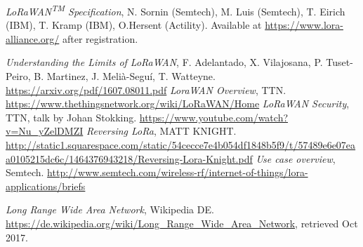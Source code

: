 \begin{thebibliography}{9}

    \textit{LoRaWAN\textsuperscript{TM} Specification}, N. Sornin (Semtech), M. Luis (Semtech), T. Eirich (IBM), T. Kramp (IBM), O.Hersent (Actility). Available at \url{https://www.lora-alliance.org/} after registration.

    \textit{Understanding the Limits of LoRaWAN}, F. Adelantado, X. Vilajosana, P. Tuset-Peiro, B. Martinez, J. Melià-Seguí, T. Watteyne. \url{https://arxiv.org/pdf/1607.08011.pdf}
    \textit{LoraWAN Overview}, TTN. \url{https://www.thethingsnetwork.org/wiki/LoRaWAN/Home}
    \textit{LoRaWAN Security}, TTN, talk by Johan Stokking. \url{https://www.youtube.com/watch?v=Nu_yZelDMZI}
    \textit{Reversing LoRa}, MATT KNIGHT. \url{http://static1.squarespace.com/static/54cecce7e4b054df1848b5f9/t/57489e6e07eaa0105215dc6c/1464376943218/Reversing-Lora-Knight.pdf}
    \textit{Use case overview}, Semtech. \url{http://www.semtech.com/wireless-rf/internet-of-things/lora-applications/briefs}


  \textit{Long Range Wide Area Network}, Wikipedia DE. \url{https://de.wikipedia.org/wiki/Long_Range_Wide_Area_Network}, retrieved Oct 2017.

\end{thebibliography}
